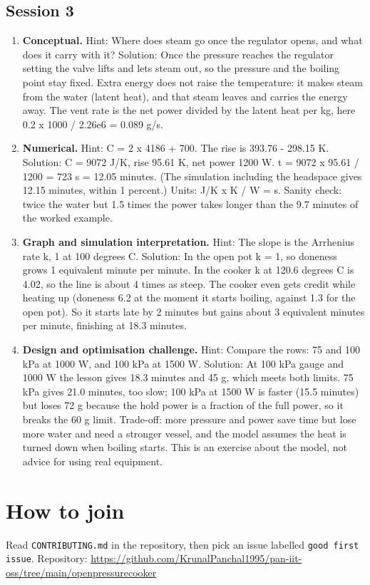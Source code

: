 \documentclass[11pt,a4paper]{article}
\begin{document}
\subsection*{Session 3}
\begin{enumerate}[nosep]
\item \textbf{Conceptual.} Hint: Where does steam go once the regulator opens, and what does it carry with it? Solution: Once the pressure reaches the regulator setting the valve lifts and lets steam out, so the pressure and the boiling point stay fixed. Extra energy does not raise the temperature: it makes steam from the water (latent heat), and that steam leaves and carries the energy away. The vent rate is the net power divided by the latent heat per kg, here 0.2 x 1000 / 2.26e6 = 0.089 g/s.
\item \textbf{Numerical.} Hint: C = 2 x 4186 + 700. The rise is 393.76 - 298.15 K. Solution: C = 9072 J/K, rise 95.61 K, net power 1200 W. t = 9072 x 95.61 / 1200 = 723 s = 12.05 minutes. (The simulation including the headspace gives 12.15 minutes, within 1 percent.) Units: J/K x K / W = s. Sanity check: twice the water but 1.5 times the power takes longer than the 9.7 minutes of the worked example.
\item \textbf{Graph and simulation interpretation.} Hint: The slope is the Arrhenius rate k, 1 at 100 degrees C. Solution: In the open pot k = 1, so doneness grows 1 equivalent minute per minute. In the cooker k at 120.6 degrees C is 4.02, so the line is about 4 times as steep. The cooker even gets credit while heating up (doneness 6.2 at the moment it starts boiling, against 1.3 for the open pot). So it starts late by 2 minutes but gains about 3 equivalent minutes per minute, finishing at 18.3 minutes.
\item \textbf{Design and optimisation challenge.} Hint: Compare the rows: 75 and 100 kPa at 1000 W, and 100 kPa at 1500 W. Solution: At 100 kPa gauge and 1000 W the lesson gives 18.3 minutes and 45 g, which meets both limits. 75 kPa gives 21.0 minutes, too slow; 100 kPa at 1500 W is faster (15.5 minutes) but loses 72 g because the hold power is a fraction of the full power, so it breaks the 60 g limit. Trade-off: more pressure and power save time but lose more water and need a stronger vessel, and the model assumes the heat is turned down when boiling starts. This is an exercise about the model, not advice for using real equipment.
\end{enumerate}

\section{How to join}
Read \texttt{CONTRIBUTING.md} in the repository, then pick an issue labelled \texttt{good first issue}. Repository: \url{https://github.com/KrunalPanchal1995/pan-iit-oss/tree/main/openpressurecooker}
\end{document}
